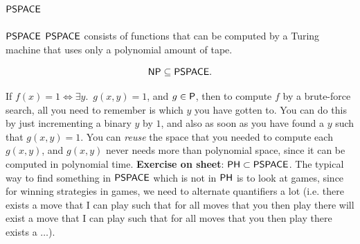 \documentclass{article}
\begin{document}
\subsection{$\mathsf{PSPACE}$}
\begin{fancydefine}{$\mathsf{PSPACE}$}
    $\mathsf{PSPACE}$ consists of functions that can be computed by a Turing machine that uses only a polynomial amount of tape.
\end{fancydefine}
\begin{fancyprop}{}
    \[\mathsf{NP} \subseteq \mathsf{PSPACE}.\]
\end{fancyprop}
\proof If $f(x) = 1 \Leftrightarrow \exists y. \,\,\, g(x,y)=1$, and $g \in \mathsf{P}$, then to compute $f$ by a brute-force search, all you need to remember is which $y$ you have gotten to. You can do this by just incrementing a binary $y$ by $1$, and also as soon as you have found a $y$ such that $g(x,y)=1$. You can \textit{reuse} the space that you needed to compute each $g(x,y)$, and $g(x,y)$ never needs more than polynomial space, since it can be computed in polynomial time. \endproof
\textbf{Exercise on sheet}: $\mathsf{PH} \subset \mathsf{PSPACE}$. The typical way to find something in $\mathsf{PSPACE}$ which is not in $\mathsf{PH}$ is to look at games, since for winning strategies in games, we need to alternate quantifiers a lot (i.e. there exists a move that I can play such that for all moves that you then play there will exist a move that I can play such that for all moves that you then play there exists a $\dots$).
\end{document}
